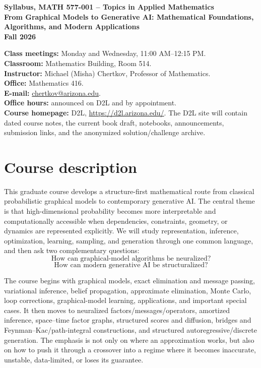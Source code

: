 \documentclass[11pt]{article}
\newcommand{\course}{MATH 577-001 -- Topics in Applied Mathematics}
\newcommand{\coursetitle}{From Graphical Models to Generative AI: Mathematical Foundations, Algorithms, and Modern Applications}
\begin{document}
\begin{center}
{\Large\bfseries Syllabus, \course}\\[2mm]
{\Large\bfseries \coursetitle}\\[2mm]
{\bfseries Fall 2026}
\end{center}

\textbf{Class meetings:} Monday and Wednesday, 11:00 AM--12:15 PM.\\
\textbf{Classroom:} Mathematics Building, Room 514.\\
\textbf{Instructor:} Michael (Misha) Chertkov, Professor of Mathematics.\\
\textbf{Office:} Mathematics 416.\\
\textbf{E-mail:} \href{mailto:chertkov@arizona.edu}{chertkov@arizona.edu}.\\
\textbf{Office hours:} announced on D2L and by appointment.\\
\textbf{Course homepage:} D2L, \url{https://d2l.arizona.edu/}. The D2L site will contain dated course notes, the current book draft, notebooks, announcements, submission links, and the anonymized solution/challenge archive.

\section*{Course description}

This graduate course develops a structure-first mathematical route from classical probabilistic graphical models to contemporary generative AI. The central theme is that high-dimensional probability becomes more interpretable and computationally accessible when dependencies, constraints, geometry, or dynamics are represented explicitly. We will study representation, inference, optimization, learning, sampling, and generation through one common language, and then ask two complementary questions:
\[
\boxed{\text{How can graphical-model algorithms be neuralized?}}
\]
\[
\boxed{\text{How can modern generative AI be structuralized?}}
\]

The course begins with graphical models, exact elimination and message passing, variational inference, belief propagation, approximate elimination, Monte Carlo, loop corrections, graphical-model learning, applications, and important special cases. It then moves to neuralized factors/messages/operators, amortized inference, space--time factor graphs, structured scores and diffusion, bridges and Feynman--Kac/path-integral constructions, and structured autoregressive/discrete generation. The emphasis is not only on where an approximation works, but also on how to push it through a crossover into a regime where it becomes inaccurate, unstable, data-limited, or loses its guarantee.
\end{document}

